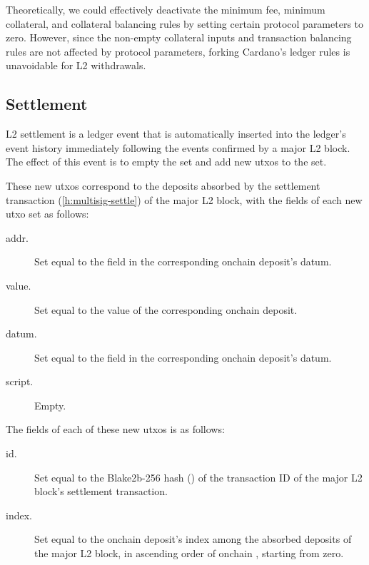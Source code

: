 \documentclass[../hydrozoa.tex]{subfiles}
\begin{document}
Theoretically, we could effectively deactivate the minimum fee, minimum collateral, and collateral balancing rules by setting certain protocol parameters to zero.
However, since the non-empty collateral inputs and transaction balancing rules are not affected by protocol parameters, forking Cardano's ledger rules is unavoidable for L2 withdrawals.

\subsection{Settlement}%
\label{h:ledger-settlement}

L2 settlement is a ledger event that is automatically inserted into the ledger's event history immediately following the events confirmed by a major L2 block.
The effect of this event is to empty the  set and add new utxos to the  set.

These new utxos correspond to the deposits absorbed by the settlement transaction (\cref{h:multisig-settle}) of the major L2 block, with the  fields of each new utxo set as follows:
\begin{description}
  \item[addr.] Set equal to the  field in the corresponding onchain deposit's datum.
  \item[value.] Set equal to the value of the corresponding onchain deposit.
  \item[datum.] Set equal to the  field in the corresponding onchain deposit's datum.
  \item[script.] Empty.
\end{description}

The  fields of each of these new utxos is as follows:
\begin{description}
  \item[id.] Set equal to the Blake2b-256 hash () of the transaction ID of the major L2 block's settlement transaction.
  \item[index.] Set equal to the onchain deposit's index among the absorbed deposits of the major L2 block, in ascending order of onchain , starting from zero.
\end{description}
\end{document}
